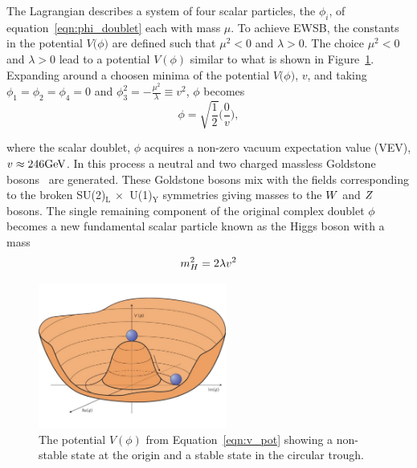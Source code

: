 The Lagrangian describes a system of four scalar particles, the $\phi_{i}$,
of equation~\ref{eqn:phi_doublet} each with mass $\mu$. 
To achieve EWSB, the constants in the potential $V\big(\phi\big)$ are defined such that $\mu^{2} < 0$
and $\lambda > 0$. The choice $\mu^{2} < 0$ and $\lambda > 0$ lead to a potential $V\left(\phi\right)$
similar to what is shown in Figure~\ref{fig:higgs_potential}. Expanding around a choosen minima of the potential
$V\big(\phi\big)$, $v$, and taking $\phi_{1} = \phi_{2} = \phi_{4} = 0$ and
$\phi_{3}^{2} = -\frac{\mu^{2}}{\lambda} \equiv v^{2}$, $\phi$ becomes
\begin{equation}
\phi = \sqrt{\frac{1}{2}} \Bigg(\frac{0}{v}\Bigg),
\label{eqn:phi_doublet_exp}
\end{equation}

where the scalar doublet, $\phi$ acquires a non-zero vacuum expectation value (VEV), $v \approx 246\mathrm{GeV}$.
In this process a neutral and two charged massless Goldstone bosons~\cite{PhysRev.127.965} are generated. These Goldstone
bosons mix with the fields corresponding to the broken SU(2)$_{\text{L}} \,\times\,$ U(1)$_{\text{Y}}$
symmetries giving masses to the $W$ and $Z$ bosons. The single remaining component of the
original complex doublet $\phi$ becomes a new fundamental scalar particle 
known as the Higgs boson with a mass
\begin{equation}
m_{H}^{2} = 2\lambda v^2
\end{equation}


\begin{figure}[htbp]
\centering
     \includegraphics[width=0.55\textwidth]{phenomology_of_processes/plots/higgs_potential.pdf}
     \caption{
The potential $V\left(\phi\right)$ from Equation~\ref{eqn:v_pot} showing a non-stable state
at the origin and a stable state in the circular trough.
     }
     \label{fig:higgs_potential}
\end{figure}



